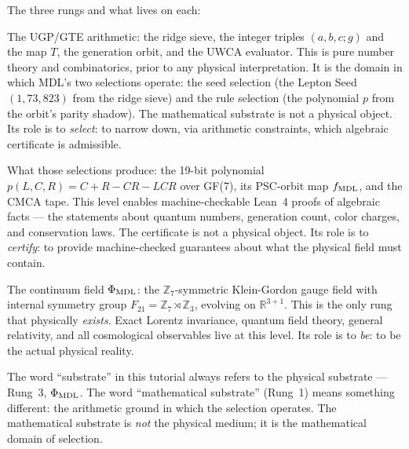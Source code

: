 \documentclass[11pt,a4paper]{article}
\newcommand{\PhiMDL}{\Phi_{\rm MDL}}
\newcommand{\ZS}{\mathbb{Z}_7}
\theoremstyle{definition}
\begin{document}
\bigskip
\noindent
The three rungs and what lives on each:

\begin{description}[leftmargin=2cm,style=nextline]
  \item[Rung 1 --- Mathematical Substrate]
    The UGP/GTE arithmetic: the ridge sieve, the integer triples $(a,b,c;g)$
    and the map $T$, the generation orbit, and the UWCA evaluator.
    This is pure number theory and combinatorics, prior to any physical
    interpretation.  It is the domain in which MDL's two selections operate:
    the seed selection (the Lepton Seed $(1,73,823)$ from the ridge sieve)
    and the rule selection (the polynomial $p$ from the orbit's parity shadow).
    The mathematical substrate is not a physical object.
    Its role is to \emph{select}: to narrow down, via arithmetic constraints,
    which algebraic certificate is admissible.

  \item[Rung 2 --- Algebraic Certificate]
    What those selections produce: the 19-bit polynomial $p(L,C,R) = C+R-CR-LCR$
    over GF(7), its PSC-orbit map $f_{\rm MDL}$, and the CMCA tape.
    This level enables machine-checkable Lean~4 proofs of algebraic facts ---
    the statements about quantum numbers, generation count, color charges,
    and conservation laws.
    The certificate is not a physical object.
    Its role is to \emph{certify}: to provide machine-checked guarantees about
    what the physical field must contain.

  \item[Rung 3 --- Physical Substrate]
    The continuum field $\PhiMDL$: the $\ZS$-symmetric Klein-Gordon gauge field
    with internal symmetry group $F_{21} = \ZS \rtimes \mathbb{Z}_3$, evolving on
    $\mathbb{R}^{3+1}$.
    This is the only rung that physically \emph{exists}.
    Exact Lorentz invariance, quantum field theory, general relativity, and all
    cosmological observables live at this level.
    Its role is to \emph{be}: to be the actual physical reality.
\end{description}

\begin{tcolorbox}[colback=boxblue,colframe=blue!40!black,
  title=An important clarification]
The word ``substrate'' in this tutorial always refers to the physical substrate ---
Rung~3, $\PhiMDL$.  The word ``mathematical substrate'' (Rung~1) means something
different: the arithmetic ground in which the selection operates.
The mathematical substrate is \emph{not} the physical medium; it is the
mathematical domain of selection.
\end{tcolorbox}
\end{document}
